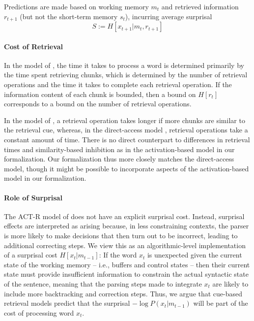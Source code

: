 \documentclass[11pt,letterpaper]{article}
\begin{document}
Predictions are made based on working memory $m_t$ and retrieved information $r_{t+1}$ (but not the short-term memory $s_t$), incurring average surprisal
\begin{equation}
    S := H[x_{t+1}|m_t, r_{t+1}]
\end{equation}


\paragraph{Cost of Retrieval}
In the model of \cite{lewis-activation-based-2005}, the time it takes to process a word is determined primarily by the time spent retrieving chunks, which is determined by the number of retrieval operations and the time it takes to complete each retrieval operation.
If the information content of each chunk is bounded, then a bound on $H[r_t]$ corresponds to a bound on the number of retrieval operations.

In the model of \cite{lewis-activation-based-2005}, a retrieval operation takes longer if more chunks are similar to the retrieval cue, whereas, in the direct-access model \citep{mcelree2000sentence,nicenboim2018models,vasishth2019computational}, retrieval operations take a constant amount of time.
There is no direct counterpart to differences in retrieval times and similarity-based inhibition as in the activation-based model in our formalization.
Our formalization thus more closely matches the direct-access model, though it might be possible to incorporate aspects of the activation-based model in our formalization.

\paragraph{Role of Surprisal}
The ACT-R model of \cite{lewis-activation-based-2005} does not have an explicit surprisal cost.
Instead, surprisal effects are interpreted as arising because, in less constraining contexts, the parser is more likely to make decisions that then turn out to be incorrect, leading to additional correcting steps.
We view this as an algorithmic-level implementation of a surprisal cost $H[x_t|m_{t-1}]$:
If the word $x_t$ is unexpected given the current state of the working memory -- i.e., buffers and control states -- then their current state must provide insufficient information to constrain the actual syntactic state of the sentence, meaning that the parsing steps made to integrate $x_t$ are likely to include more backtracking and correction steps.
Thus, we argue that cue-based retrieval models predict that the surprisal $- \log P(x_t|m_{t-1})$ will be part of the cost of processing word $x_t$.
\end{document}
